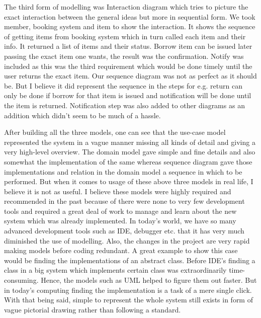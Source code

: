\documentclass[12pt]{article}
\begin{document}
The third form of modelling was Interaction diagram which tries to picture the exact interaction between the general ideas but more in sequential form. We took member, booking system and item to show the interaction. It shows the sequence of getting items from booking system which in turn called each item and their info. It returned a list of items and their status. Borrow item can be issued later passing the exact item one wants, the result was the confirmation. Notify was included as this was the third requirement which would be done timely until the user returns the exact item. Our sequence diagram was not as perfect as it should be. But I believe it did represent the sequence in the steps for e.g. return can only be done if borrow for that item is issued and notification will be done until the item is returned. Notification step was also added to other diagrams as an addition which didn't seem to be much of a hassle. 

After building all the three models, one can see that the use-case model represented the system in a vague manner missing all kinds of detail and giving a very high-level overview. The domain model gave simple and fine details and also somewhat the implementation of the same whereas sequence diagram gave those implementations and relation in the domain model a sequence in which to be performed. But when it comes to usage of these above three models in real life, I believe it is not as useful. I believe these models were highly required and recommended in the past because of there were none to very few development tools and required a great deal of work to manage and learn about the new system which was already implemented. In today's world, we have so many advanced development tools such as IDE, debugger etc. that it has very much diminished the use of modelling. Also, the changes in the project are very rapid making models before coding redundant. A great example to show this case would be finding the implementations of an abstract class. Before IDE's finding a class in a big system which implements certain class was extraordinarily time-consuming. Hence, the models such as UML helped to figure them out faster. But in today's computing finding the implementation is a task of a mere single click. With that being said, simple to represent the whole system still exists in form of vague pictorial drawing rather than following a standard.
\end{document}

